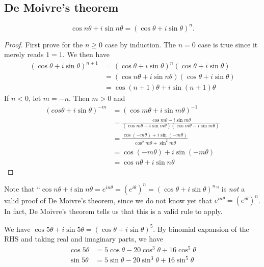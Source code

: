 \documentclass[a4paper]{article}
\begin{document}
\subsection{De Moivre's theorem}
\begin{thm}
  \[
    \cos n\theta + i\sin n\theta = (\cos\theta + i\sin\theta)^n.
  \]
\end{thm}
\begin{proof}
  First prove for the $n \geq 0$ case by induction. The $n = 0$ case is true since it merely reads $1 = 1$. We then have
  \begin{align*}
    (\cos\theta + i\sin\theta)^{n + 1} &= (\cos\theta + i\sin\theta)^n (\cos\theta + i\sin\theta)\\
    &= (\cos n\theta + i\sin n\theta )(\cos\theta + i\sin\theta)\\
    &= \cos(n+1)\theta + i\sin(n+1)\theta
  \end{align*}
  If $n < 0$, let $m = -n$. Then $m > 0$ and
  \begin{align*}
    (cos\theta + i\sin\theta)^{-m} &= (\cos m\theta + i\sin m\theta)^{-1}\\
    &= \frac{\cos m\theta - i\sin m\theta}{(\cos m\theta + i\sin m\theta)(\cos m\theta - i\sin m\theta)}\\
    &= \frac{\cos (-m\theta) + i\sin (-m\theta)}{\cos^2 m\theta + \sin^2 m\theta}\\
    &= \cos (-m\theta) + i\sin (-m\theta)\\
    &= \cos n\theta + i\sin n\theta
  \end{align*}
\end{proof}
Note that ``$\cos n\theta + i\sin n\theta = e^{in\theta} = (e^{i\theta})^n = (\cos \theta + i\sin \theta)^n$'' is \emph{not} a valid proof of De Moivre's theorem, since we do not know yet that $e^{in\theta} = (e^{i\theta})^n$. In fact, De Moivre's theorem tells us that this is a valid rule to apply.

\begin{eg}
  We have $\cos 5\theta + i\sin5\theta  = (\cos\theta + i\sin\theta)^5$. By binomial expansion of the RHS and taking real and imaginary parts, we have
  \begin{align*}
    \cos 5\theta &= 5\cos\theta - 20\cos^3\theta + 16\cos^5\theta\\
    \sin 5\theta &= 5\sin\theta - 20\sin^3\theta + 16\sin^5\theta
  \end{align*}
\end{eg}
\end{document}

